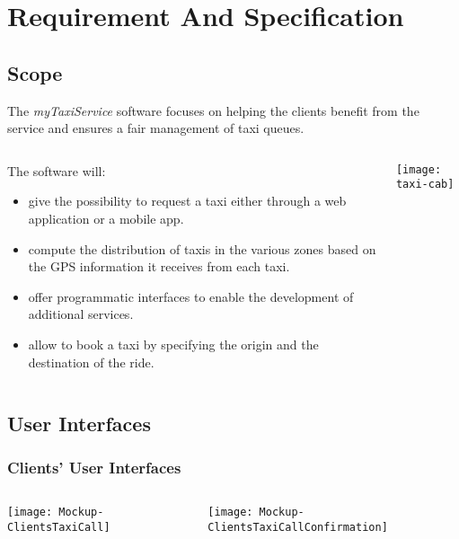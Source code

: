 \section{Requirement And Specification}


\subsection{Scope}

\begin{frame}{\currentname}

The \emph{myTaxiService} software focuses on helping the clients benefit from the service and ensures a fair management of taxi queues.

\vfill

\begin{columns}[c]
  \begin{column}{.5\textwidth}
    The software will:
    \begin{itemize}
    \item give the possibility to request a taxi either through a web application or a mobile app.
    \item compute the distribution of taxis in the various zones based on the GPS information it receives from each taxi.
    \item offer programmatic interfaces to enable the development of additional services.
    \item allow to book a taxi by specifying the origin and the destination of the ride.
    \end{itemize}
  \end{column}
  \begin{column}{.47\textwidth}
    \texttt{[image: taxi-cab]}
		\centering
  \end{column}
\end{columns}

\end{frame}

\subsection{User Interfaces}

\subsubsection{Clients' User Interfaces}
\begin{frame}{\currentname{}}
\begin{columns}[c]
  \begin{column}{.5\textwidth}
		\texttt{[image: Mockup-ClientsTaxiCall]}
		\centering
  \end{column}
  \begin{column}{.5\textwidth}
    \texttt{[image: Mockup-ClientsTaxiCallConfirmation]}
		\centering
  \end{column}
\end{columns}
\end{frame}


